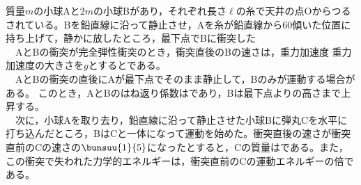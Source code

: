 \hakosyokika
\item
    \begin{mawarikomi}{150pt}{}
        質量$m$の小球Aと$2m$の小球Bがあり，それぞれ長さ$\ell $の糸で天井の点Oからつるされている。Bを鉛直線に沿って静止させ，Aを糸が鉛直線から60\Deg 傾いた位置に持ち上げて，静かに放したところ，最下点でBに衝突した\\
        ~~AとBの衝突が完全弾性衝突のとき，衝突直後のBの速さは，重力加速度
        重力加速度の大きさを$g$とすると\Hako である。\\
        ~~AとBの衝突の直後にAが最下点でそのまま静止して，Bのみが運動する場合がある。
        このとき，AとBのはね返り係数は\Hako であり，Bは最下点より\Hako の高さまで上昇する。\\
        ~~次に，小球Aを取り去り，鉛直線に沿って静止させた小球Bに弾丸Cを水平に打ち込んだところ，BはCと一体になって運動を始めた。衝突直後の速さが衝突直前のCの速さの$\bunsuu{1}{5}$になったとすると，Cの質量は\Hako である。また，この衝突で失われた力学的エネルギーは，衝突直前のCの運動エネルギーの\Hako 倍である。
    \end{mawarikomi}